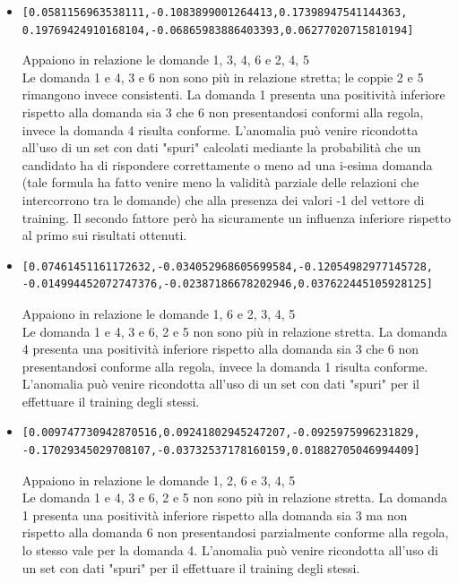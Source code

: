 \documentclass[10pt,a4paper]{article}
\begin{document}
\begin{itemize}
\item  \begin{verbatim}[0.0581156963538111,-0.1083899001264413,0.17398947541144363,
0.19769424910168104,-0.06865983886403393,0.06277020715810194]\end{verbatim}
Appaiono in relazione le domande 1, 3, 4, 6 e 2, 4, 5\\
Le domanda 1 e 4, 3 e 6  non sono pi\`u in relazione stretta; le coppie 2 e 5 rimangono invece consistenti. La domanda 1 presenta una positivit\`a inferiore rispetto alla domanda sia 3 che 6 non presentandosi conformi alla regola, invece la domanda 4 risulta conforme. L'anomalia pu\`o venire ricondotta all'uso di un set con dati "spuri" calcolati mediante la probabilit\`a che un candidato ha di rispondere correttamente o meno ad una i-esima domanda (tale formula ha fatto venire meno la validit\`a parziale delle relazioni che intercorrono tra le domande) che alla presenza dei valori -1 del vettore di training. Il secondo fattore per\`o ha sicuramente un influenza inferiore rispetto al primo sui risultati ottenuti.

\item  \begin{verbatim}[0.07461451161172632,-0.034052968605699584,-0.12054982977145728,
-0.014994452072747376,-0.02387186678202946,0.037622445105928125]\end{verbatim}
Appaiono in relazione le domande 1, 6 e 2, 3, 4, 5\\
Le domanda 1 e 4, 3 e 6, 2 e 5  non sono pi\`u in relazione stretta. La domanda 4 presenta una positivit\`a inferiore rispetto alla domanda sia 3 che 6 non presentandosi conforme alla regola, invece la domanda 1 risulta conforme. L'anomalia pu\`o venire ricondotta all'uso di un set con dati "spuri" per il effettuare il training degli stessi.

\item  \begin{verbatim}[0.009747730942870516,0.09241802945247207,-0.0925975996231829,
-0.17029345029708107,-0.03732537178160159,0.01882705046994409]\end{verbatim}
Appaiono in relazione le domande 1, 2, 6 e 3, 4, 5\\
Le domanda 1 e 4, 3 e 6, 2 e 5  non sono pi\`u in relazione stretta. La domanda 1 presenta una positivit\`a inferiore rispetto alla domanda sia 3 ma non rispetto alla domanda 6 non presentandosi parzialmente conforme alla regola, lo stesso vale per la domanda 4. L'anomalia pu\`o venire ricondotta all'uso di un set con dati "spuri" per il effettuare il training degli stessi.


\end{itemize}
\end{document}
